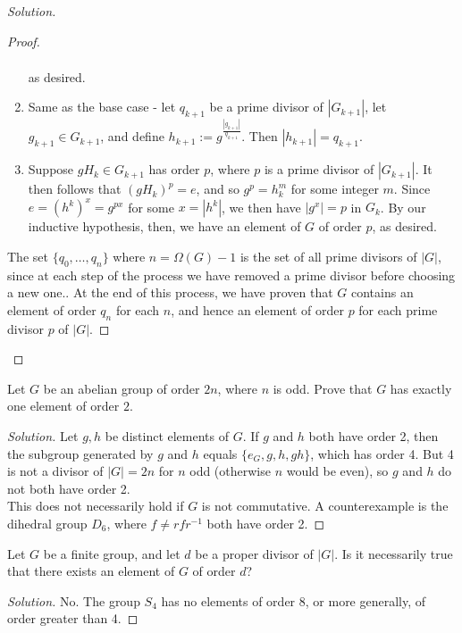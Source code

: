 \documentclass[12pt]{article}
\newenvironment{problem}[2][Problem]{\begin{trivlist}
\item[\hskip \labelsep {\bfseries #1}\hskip \labelsep {\bfseries #2.}]}{\end{trivlist}}
\newenvironment{solution}
  {\renewcommand\qedsymbol{$\blacksquare$}\begin{proof}[Solution]}
{\end{proof}}
\newenvironment{sproof}{
  \renewcommand\qedsymbol{$\square$}
  \begin{proof}
  }{
  \end{proof}
}
\theoremstyle{remark}
\begin{document}
\begin{solution}
\begin{sproof}
\begin{enumerate}
\begin{align*}
        \end{align*}
        as desired.
      \item Same as the base case - let $q_{k+1}$ be a prime divisor of $|G_{k+1}|$, 
        let $g_{k+1}\in G_{k+1}$, and define $h_{k+1}:=g^{\frac{|g_{k+1}|}{q_{k+1}}}$.
        Then $|h_{k+1}|=q_{k+1}$.
      \item Suppose $gH_k\in G_{k+1}$ has order $p$, where $p$ is a prime divisor of $|G_{k+1}|$.
        It then follows that $(gH_k)^p = e$, and so $g^p=h_k^m$ for some integer $m$.
        Since $e=(h^k)^x = g^{px}$ for some $x=|h^k|$, we then have $|g^x|=p$ in $G_k$.
        By our inductive hypothesis, then, we have an element of $G$ of order $p$, as desired.
    \end{enumerate}
    The set $\{q_0, \dots, q_n\}$ where $n=\Omega(G)-1$ is the set of all prime divisors of $|G|$,
    since at each step of the process we have removed a prime divisor before choosing a new one..
    At the end of this process, we have proven that $G$ contains an element of order $q_n$ for each $n$,
    and hence an element of order $p$ for each prime divisor $p$ of $|G|$.
  \end{sproof}
\end{solution}

\begin{problem}{8.18}
  Let $G$ be an abelian group of order $2n$, where $n$ is odd.
  Prove that $G$ has exactly one element of order $2$.
\end{problem}
\begin{solution}
  Let $g,h$ be distinct elements of $G$. 
  If $g$ and $h$ both have order 2, then the subgroup generated by $g$ and $h$ 
  equals $\{e_G,g,h,gh\}$, which has order 4.
  But 4 is not a divisor of $|G|=2n$ for $n$ odd (otherwise $n$ would be even), so $g$ and $h$ do not both have
  order 2. \\
  This does not necessarily hold if $G$ is not commutative. 
  A counterexample is the dihedral group $D_6$, where $f\neq rfr^{-1}$ both have order 2.
\end{solution}
\begin{problem}{8.19}
  Let $G$ be a finite group, and let $d$ be a proper divisor of $|G|$.
  Is it necessarily true that there exists an element of $G$ of order $d$?
\end{problem}
\begin{solution}
  No.
  The group $S_4$ has no elements of order 8, or more generally, of order greater than 4.
\end{solution}
\end{document}
